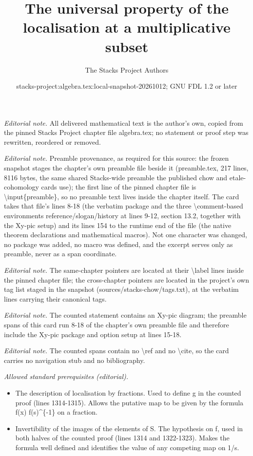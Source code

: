 \documentclass[10pt,a4paper]{amsart}
\title{The universal property of the localisation at a multiplicative subset}
\author{The Stacks Project Authors}
\date{stacks-project:algebra.tex:local-snapshot-20261012; GNU FDL 1.2 or later}
\theoremstyle{plain}
\theoremstyle{definition}
\theoremstyle{remark}
\numberwithin{equation}{subsection}
\begin{document}
\maketitle
\noindent\textit{Editorial note.} All delivered mathematical text is the author's own, copied from the pinned Stacks Project chapter file algebra.tex; no statement or proof step was rewritten, reordered or removed.\par\medskip
\noindent\textit{Editorial note.} Preamble provenance, as required for this source: the frozen snapshot stages the chapter's own preamble file beside it (preamble.tex, 217 lines, 8116 bytes, the same shared Stacks-wide preamble the published chow and etale-cohomology cards use); the first line of the pinned chapter file is \textbackslash{}input\{preamble\}, so no preamble text lives inside the chapter itself. The card takes that file's lines 8-18 (the verbatim package and the three \textbackslash{}comment-based environments reference/slogan/history at lines 9-12, section 13.2, together with the Xy-pic setup) and its lines 154 to the runtime end of the file (the native theorem declarations and mathematical macros). Not one character was changed, no package was added, no macro was defined, and the excerpt serves only as preamble, never as a span coordinate.\par\medskip
\noindent\textit{Editorial note.} The same-chapter pointers are located at their \textbackslash{}label lines inside the pinned chapter file; the cross-chapter pointers are located in the project's own tag list staged in the snapshot (sources/stacks-chow/tags.txt), at the verbatim lines carrying their canonical tags.\par\medskip
\noindent\textit{Editorial note.} The counted statement contains an Xy-pic diagram; the preamble spans of this card run 8-18 of the chapter's own preamble file and therefore include the Xy-pic package and option setup at lines 15-18.\par\medskip
\noindent\textit{Editorial note.} The counted spans contain no \textbackslash{}ref and no \textbackslash{}cite, so the card carries no navigation stub and no bibliography.\par\medskip
\noindent\textit{Allowed standard prerequisites (editorial).}\begin{itemize}
\item The description of localisation by fractions. Used to define g in the counted proof (lines 1314-1315). Allows the putative map to be given by the formula f(x) f(s)\textasciicircum{}\{-1\} on a fraction.
\item Invertibility of the images of the elements of S. The hypothesis on f, used in both halves of the counted proof (lines 1314 and 1322-1323). Makes the formula well defined and identifies the value of any competing map on 1/s.
\end{itemize}\medskip
\end{document}
